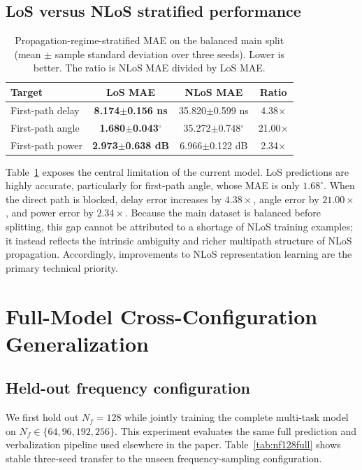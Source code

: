 \documentclass{article}
\begin{document}
\subsection{LoS versus NLoS stratified performance}
\label{sec:losnlos}

\begin{table}[t]
\centering
\caption{Propagation-regime-stratified MAE on the balanced main split (mean $\pm$ sample standard deviation over three seeds). Lower is better. The ratio is NLoS MAE divided by LoS MAE.}
\label{tab:losnlos}
\begin{tabular}{lccc}
\toprule
Target & LoS MAE & NLoS MAE & Ratio\\
\midrule
First-path delay & \textbf{8.174$\pm$0.156 ns} & 35.820$\pm$0.599 ns & 4.38$\times$\\
First-path angle & \textbf{1.680$\pm$0.043$^\circ$} & 35.272$\pm$0.748$^\circ$ & 21.00$\times$\\
First-path power & \textbf{2.973$\pm$0.638 dB} & 6.966$\pm$0.122 dB & 2.34$\times$\\
\bottomrule
\end{tabular}
\end{table}

Table~\ref{tab:losnlos} exposes the central limitation of the current model.
LoS predictions are highly accurate, particularly for first-path angle, whose MAE is only $1.68^\circ$.
When the direct path is blocked, delay error increases by $4.38\times$, angle error by $21.00\times$, and power error by $2.34\times$.
Because the main dataset is balanced before splitting, this gap cannot be attributed to a shortage of NLoS training examples; it instead reflects the intrinsic ambiguity and richer multipath structure of NLoS propagation.
Accordingly, improvements to NLoS representation learning are the primary technical priority.

\section{Full-Model Cross-Configuration Generalization}
\label{sec:generalization}

\subsection{Held-out frequency configuration}

We first hold out $N_f=128$ while jointly training the complete multi-task model on $N_f\in\{64,96,192,256\}$.
This experiment evaluates the same full prediction and verbalization pipeline used elsewhere in the paper.
Table~\ref{tab:nf128full} shows stable three-seed transfer to the unseen frequency-sampling configuration.
\end{document}
